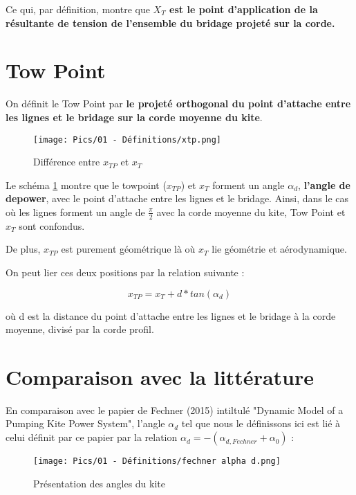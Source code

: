 Ce qui, par définition, montre que \textbf{$X_T$ est le point d'application de la résultante de tension de l'ensemble du bridage projeté sur la corde.}

\section{\textbf{Tow Point}}
\label{sec:Ch1.2} 

On définit le Tow Point par \textbf{le projeté orthogonal du point d'attache entre les lignes et le bridage sur la corde moyenne du kite}. 

\begin{figure}[H]
    \centering
    \texttt{[image: Pics/01 - Définitions/xtp.png]}  
    \caption{Différence entre $x_{TP}$ et $x_T$}
    \label{fig:Xtp}
\end{figure}

Le schéma \ref{fig:Xtp} montre que le towpoint ($x_{TP}$) et $x_T$ forment un angle $\alpha_d$, \textbf{l'angle de depower}, avec le point d'attache entre les lignes et le bridage. Ainsi, dans le cas où les lignes forment un angle de $\frac{\pi}{2}$ avec la corde moyenne du kite, Tow Point et $x_T$ sont confondus. 

De plus, $x_{TP}$ est purement géométrique là où $x_T$ lie géométrie et aérodynamique.

On peut lier ces deux positions par la relation suivante : 

\begin{equation}
    x_{TP} = x_T + d * tan(\alpha_d)
    \label{eq:Xtp}
\end{equation}

où d est la distance du point d’attache entre les lignes et le bridage à la corde moyenne, divisé par la corde profil.

\section{Comparaison avec la littérature}
\label{sec:Ch1.3} 

En comparaison avec le papier de Fechner (2015) intiltulé "Dynamic Model of a Pumping Kite Power System", l'angle $\alpha_d$ tel que nous le définissons ici est lié à celui définit par ce papier par la relation $\alpha_d = -(\alpha_{d, Fechner} + \alpha_0)$ : 

\begin{figure}[H]
    \centering
    \texttt{[image: Pics/01 - Définitions/fechner alpha d.png]}  
    \caption{Présentation des angles du kite}
    \label{fig:fechner alpha d}
\end{figure}

